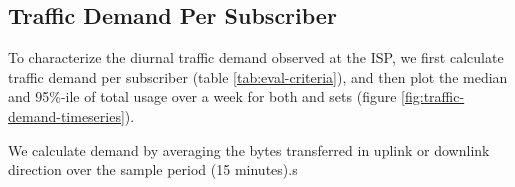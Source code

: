 \subsection{Traffic Demand Per Subscriber}\label{subsec:behavior}

To characterize the diurnal traffic demand observed at the ISP, we first 
calculate traffic demand per subscriber (table \ref{tab:eval-criteria}), and 
then plot the median and 95\%-ile of total usage over a week for both 
\treatment{} and \control{} sets (figure \ref{fig:traffic-demand-timeseries}).

We calculate demand by averaging the 
bytes transferred in uplink or downlink direction over the sample period (15 
minutes).s

